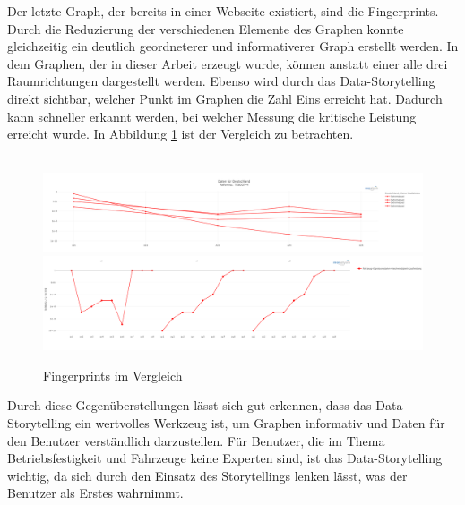 Der letzte Graph, der bereits in einer Webseite existiert, sind die Fingerprints. Durch die Reduzierung der verschiedenen Elemente des Graphen konnte gleichzeitig ein deutlich geordneterer und informativerer Graph erstellt werden. In dem Graphen, der in dieser Arbeit erzeugt wurde, können anstatt einer alle drei Raumrichtungen dargestellt werden. Ebenso wird durch das Data-Storytelling direkt sichtbar, welcher Punkt im Graphen die Zahl Eins erreicht hat. Dadurch kann schneller erkannt werden, bei welcher Messung die kritische Leistung erreicht wurde. In Abbildung \ref{fig:fingerprints_compare} ist der Vergleich zu betrachten.\\\\ 
\begin{figure}[!h]
    \centering
    \includegraphics[width=1\linewidth]{gfx/fingerprints_old.png}
        \includegraphics[width=1\linewidth]{gfx/fingerprints_new.png}
    \caption{Fingerprints im Vergleich}
    \label{fig:fingerprints_compare}
\end{figure}
\noindent
Durch diese Gegenüberstellungen lässt sich gut erkennen, dass das Data-Storytelling ein wertvolles Werkzeug ist, um Graphen informativ und Daten für den Benutzer verständlich darzustellen. Für Benutzer, die im Thema Betriebsfestigkeit und Fahrzeuge keine Experten sind, ist das Data-Storytelling wichtig, da sich durch den Einsatz des Storytellings lenken lässt, was der Benutzer als Erstes wahrnimmt.  
